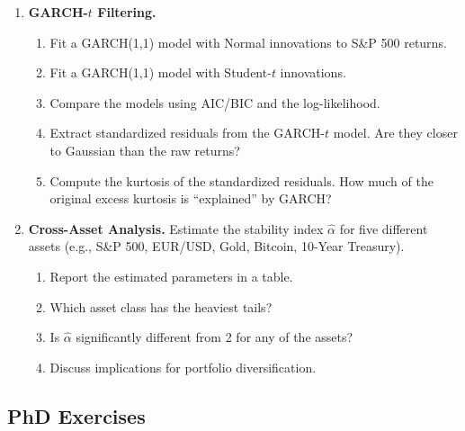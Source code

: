 \documentclass[11pt, a4paper]{article}
\theoremstyle{definition}
\begin{document}
\begin{enumerate}[label=\textbf{M\arabic*.}]
\item \textbf{GARCH-$t$ Filtering.}
\begin{enumerate}[label=(\alph*)]
  \item Fit a GARCH(1,1) model with Normal innovations to S\&P 500 returns.
  \item Fit a GARCH(1,1) model with Student-$t$ innovations.
  \item Compare the models using AIC/BIC and the log-likelihood.
  \item Extract standardized residuals from the GARCH-$t$ model. Are they closer to Gaussian than the raw returns?
  \item Compute the kurtosis of the standardized residuals. How much of the original excess kurtosis is ``explained'' by GARCH?
\end{enumerate}

\item \textbf{Cross-Asset Analysis.}
Estimate the stability index $\hat{\alpha}$ for five different assets (e.g., S\&P 500, EUR/USD, Gold, Bitcoin, 10-Year Treasury).
\begin{enumerate}[label=(\alph*)]
  \item Report the estimated parameters in a table.
  \item Which asset class has the heaviest tails?
  \item Is $\hat{\alpha}$ significantly different from 2 for any of the assets?
  \item Discuss implications for portfolio diversification.
\end{enumerate}

\end{enumerate}

\subsection{PhD Exercises}
\end{document}

